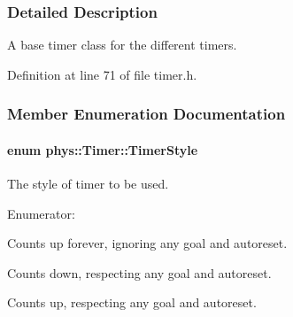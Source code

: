 \subsubsection{Detailed Description}
A base timer class for the different timers. 

Definition at line 71 of file timer.h.



\subsubsection{Member Enumeration Documentation}
\hypertarget{classphys_1_1Timer_a1ee86bf43e20329d750c5d582dcce329}{
\paragraph[{TimerStyle}]{\setlength{\rightskip}{0pt plus 5cm}enum {\bf phys::Timer::TimerStyle}}\hfill}
\label{d3/d83/classphys_1_1Timer_a1ee86bf43e20329d750c5d582dcce329}


The style of timer to be used. 

\begin{Desc}
\item[Enumerator: ]\par
\begin{description}
\item[{\em 
\hypertarget{classphys_1_1Timer_a1ee86bf43e20329d750c5d582dcce329a5debd5b8437d14405bf25cd9b130449f}{
Normal}
\label{d3/d83/classphys_1_1Timer_a1ee86bf43e20329d750c5d582dcce329a5debd5b8437d14405bf25cd9b130449f}
}]Counts up forever, ignoring any goal and autoreset. \item[{\em 
\hypertarget{classphys_1_1Timer_a1ee86bf43e20329d750c5d582dcce329a7599daa63100c2134df7d8b7c9b7f867}{
StopWatch}
\label{d3/d83/classphys_1_1Timer_a1ee86bf43e20329d750c5d582dcce329a7599daa63100c2134df7d8b7c9b7f867}
}]Counts down, respecting any goal and autoreset. \item[{\em 
\hypertarget{classphys_1_1Timer_a1ee86bf43e20329d750c5d582dcce329ae9b9fa35767e4ac2c87c078e1d9a0729}{
Alarm}
\label{d3/d83/classphys_1_1Timer_a1ee86bf43e20329d750c5d582dcce329ae9b9fa35767e4ac2c87c078e1d9a0729}
}]Counts up, respecting any goal and autoreset. \end{description}
\end{Desc}



